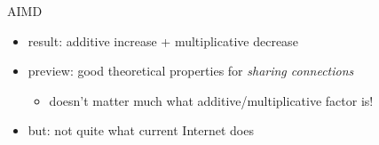 
\begin{frame}{AIMD}
    \begin{itemize}
    \item result: additive increase + multiplicative decrease
    \vspace{.5cm}
    \item preview: good theoretical properties for \textit{sharing connections}
        \begin{itemize}
        \item doesn't matter much what additive/multiplicative factor is!
        \end{itemize}
    \item but: not quite what current Internet does
    \end{itemize}
\end{frame}
